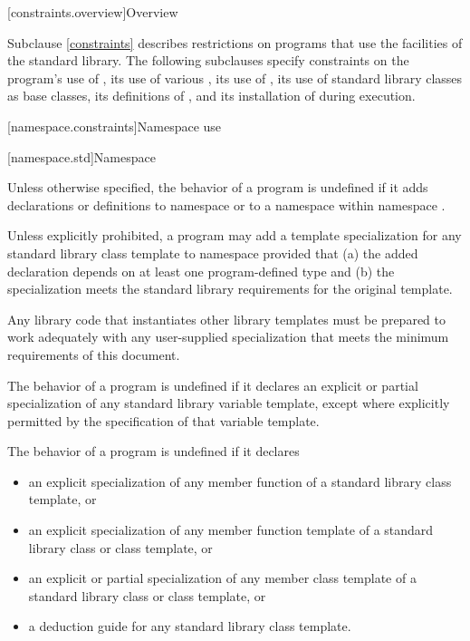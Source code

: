 [constraints.overview]{Overview}

\pnum
Subclause \ref{constraints} describes restrictions on \Cpp{} programs that use the facilities of
the \Cpp{} standard library. The following subclauses specify constraints on the
program's use of , its use of various , its use of , its use of
standard library classes as base classes, its
definitions of , and its
installation of  during execution.

[namespace.constraints]{Namespace use}

[namespace.std]{Namespace }

\pnum
Unless otherwise specified,
the behavior of a \Cpp{} program is undefined if it adds declarations or definitions to namespace
or to a namespace within namespace
.

\pnum
Unless explicitly prohibited,
a program may add a template specialization for
any standard library class template
to namespace
 provided that
(a) the added declaration
depends on at least one program-defined type
and
(b) the specialization meets the standard library requirements
for the original template.
\begin{footnote}
Any
library code that instantiates other library templates
must be prepared to work adequately with any user-supplied specialization
that meets the minimum requirements of this document.
\end{footnote}

\pnum
The behavior of a \Cpp{} program is undefined
if it declares an explicit or partial specialization
of any standard library variable template,
except where explicitly permitted by the specification of that variable template.

\pnum
The behavior of a \Cpp{} program is undefined if it declares
\begin{itemize}
\item an explicit specialization of any member function of a standard
library class template, or

\item an explicit specialization of any member function template of a
standard library class or class template, or

\item an explicit or partial specialization of any member class template
of a standard library class or class template, or

\item a deduction guide for any standard library class template.
\end{itemize}

